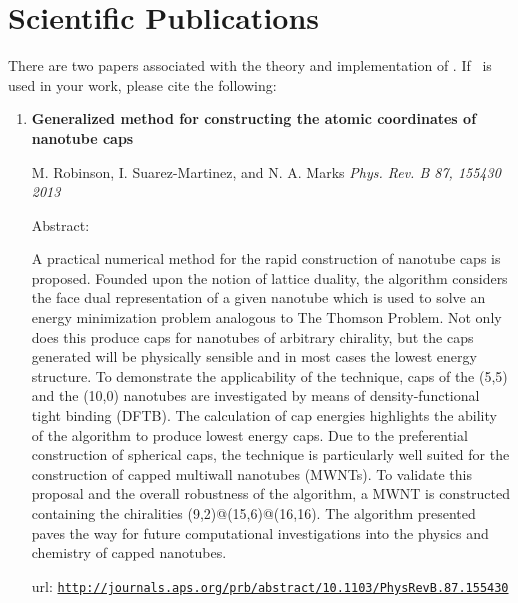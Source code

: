%
%

\section{Scientific Publications}

There are two papers associated with the theory and implementation of \nanocap. If \nanocap~is used in your work, please cite the following:

\begin{enumerate}
\item \textbf{Generalized method for constructing the atomic coordinates of nanotube caps}

M. Robinson, I. Suarez-Martinez, and N. A. Marks \textit{Phys. Rev. B 87, 155430 2013}

Abstract:

A practical numerical method for the rapid construction of nanotube caps is proposed. 
Founded upon the notion of lattice duality, the algorithm considers the face dual representation of a given nanotube which is used to solve an energy minimization problem analogous to The Thomson Problem. 
Not only does this produce caps for nanotubes of arbitrary chirality, but the caps generated will be physically sensible and in most cases the lowest energy structure. 
To demonstrate the applicability of the technique, caps of the (5,5) and the (10,0) nanotubes are investigated by means of density-functional tight binding (DFTB). 
The calculation of cap energies highlights the ability of the algorithm to produce lowest energy caps. 
Due to the preferential construction of spherical caps, the technique is particularly well suited for the construction of capped multiwall nanotubes (MWNTs). To validate this proposal and the overall robustness of the algorithm, a MWNT is constructed containing the chiralities (9,2)@(15,6)@(16,16). 
The algorithm presented paves the way for future computational investigations into the physics and chemistry of capped nanotubes.


url: \href{http://journals.aps.org/prb/abstract/10.1103/PhysRevB.87.155430}{\texttt{http://journals.aps.org/prb/abstract/10.1103/PhysRevB.87.155430}}


\end{enumerate}
